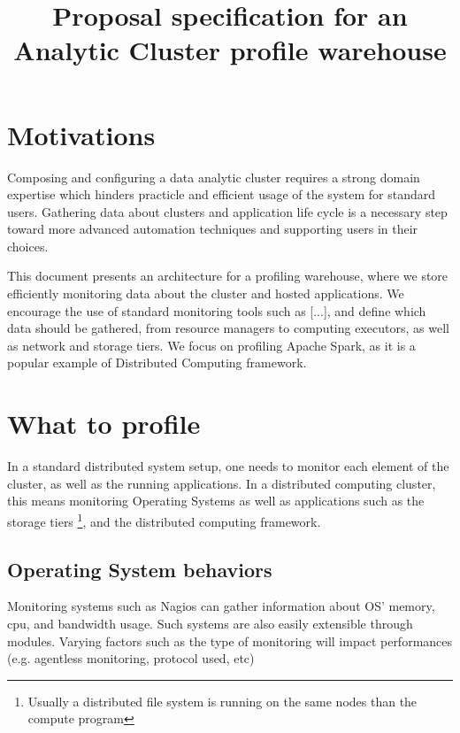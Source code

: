 \documentclass[12pt,twocolumn]{article}
\title{Proposal specification for an Analytic Cluster profile warehouse}
\begin{document}
\section{Motivations}
  Composing and configuring a data analytic cluster requires a strong domain expertise which hinders
  practicle and efficient usage of the system for standard users. Gathering data about
  clusters and application life cycle is a necessary step toward more advanced automation techniques
  and supporting users in their choices.
  \par
  This document presents an architecture for a profiling warehouse, where we store efficiently
  monitoring data about the cluster and hosted applications. We encourage the use of standard
  monitoring tools such as [...], and define which data should be gathered, from resource managers
  to computing executors, as well as network and storage tiers. We focus on profiling Apache Spark,
  as it is a popular example of Distributed Computing framework.

\section{What to profile}
  In a standard distributed system setup, one needs to monitor each element of the cluster, as well
  as the running applications. In a distributed computing cluster, this means monitoring
  Operating Systems as well as applications such as the storage tiers \footnote{Usually a distributed
  file system is running on the same nodes than the compute program}, and the distributed computing
  framework.

  \subsection{Operating System behaviors}
    Monitoring systems such as Nagios can gather information about OS' memory, cpu, and bandwidth
    usage. Such systems are also easily extensible through modules. Varying factors such as the
    type of monitoring will impact performances (e.g. agentless monitoring, protocol used, etc)
\end{document}
